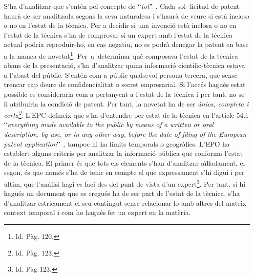 \documentclass[12pt]{article}
\begin{document}
\begin{enumerate}
\vspace{\baselineskip}
\begin{justify}
S’ha d’analitzar que s’entén pel concepte de \textit{$``$tot$"$ .} Cada sol$ \cdot $ licitud de patent haurà de ser analitzada segons la seva naturalesa i s’haurà de veure si està inclosa o no en l’estat de la tècnica. Per a decidir si una invenció està inclosa o no en l’estat de la tècnica s’ha de comprovar si un expert amb l’estat de la tècnica actual podria reproduir-ho, en cas negatiu, no es podrà denegar la patent en base a la manca de novetat\footnote{ Id. Pàg. 120. }.  Per\ a\ determinar què composava l’estat de la tècnica abans de la presentació, s’ha d’analitzar quina informació científic-tècnica estava a l’abast del públic. S’entén com a públic qualsevol persona tercera, que sense trencar cap deure de confidencialitat o secret empresarial. Si l’accés hagués estat possible es consideraria com a pertanyent a l’estat de la tècnica i per tant, no se li atribuiria la condició de patent.   Per tant, la novetat ha de ser \textit{única, completa i certa\footnote{ Id. Pàg. 123. }}.  L’EPC defineix que s’ha d’entendre per estat de la tècnica en l’article 54.1 \textit{$``$everything made available to the public by means of a written or oral description, by use, or in any other way, before the date of filing of the European patent application$"$ , }tampoc hi ha límits temporals o geogràfics. L’EPO ha establert alguns criteris per analitzar la informació pública que conforma l’estat de la tècnica. El primer és que tots els elements s’han d’analitzar aïlladament, el segon, és que només s’ha de tenir en compte el que expressament s’hi digui i per últim, que l’anàlisi hagi es faci des del punt de vista d’un expert\footnote{ Id. Pàg 123.  }. Per tant, si hi hagués un document que es cregués ha de ser part de l’estat de la tècnica, s’ha d’analitzar estricament el seu contingut sense relacionar-lo amb altres del mateix context temporal i com ho hagués fet un expert en la matèria. 
\end{justify}\par



\end{enumerate}
\end{document}
